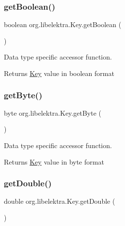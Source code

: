 \subsubsection{\texorpdfstring{get\+Boolean()}{getBoolean()}}
{\footnotesize\ttfamily boolean org.\+libelektra.\+Key.\+get\+Boolean (\begin{DoxyParamCaption}{ }\end{DoxyParamCaption})\hspace{0.3cm}{\ttfamily [inline]}}



Data type specific accessor function. 

\begin{DoxyReturn}{Returns}
\hyperlink{classorg_1_1libelektra_1_1Key}{Key} value in boolean format 
\end{DoxyReturn}
\mbox{\label{classorg_1_1libelektra_1_1Key_ad29faef52eb7ceb2940d4960a5717b5c}} 
\subsubsection{\texorpdfstring{get\+Byte()}{getByte()}}
{\footnotesize\ttfamily byte org.\+libelektra.\+Key.\+get\+Byte (\begin{DoxyParamCaption}{ }\end{DoxyParamCaption})\hspace{0.3cm}{\ttfamily [inline]}}



Data type specific accessor function. 

\begin{DoxyReturn}{Returns}
\hyperlink{classorg_1_1libelektra_1_1Key}{Key} value in byte format 
\end{DoxyReturn}
\mbox{\label{classorg_1_1libelektra_1_1Key_a64f1c2bc6776b8f08d8e50554713d07a}} 
\subsubsection{\texorpdfstring{get\+Double()}{getDouble()}}
{\footnotesize\ttfamily double org.\+libelektra.\+Key.\+get\+Double (\begin{DoxyParamCaption}{ }\end{DoxyParamCaption})\hspace{0.3cm}{\ttfamily [inline]}}



